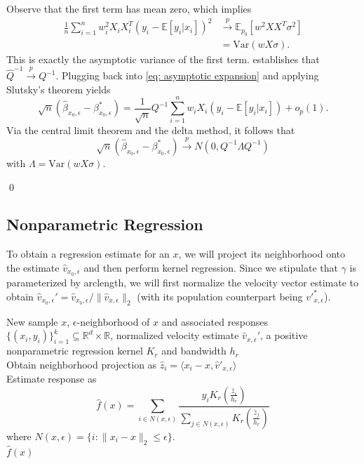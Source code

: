 \documentclass[11pt]{article}
\begin{document}
Observe that the first term has mean zero, which implies
\begin{align*}
    \frac{1}{n}\sum_{i = 1}^nw_i^2X_iX_i^T(y_i - \mathbb{E}[y_i|x_i])^2 &\overset{p}{\rightarrow} \mathbb{E}_{p_0}\left[w^2XX^T\sigma^2\right] \\
    &= \text{Var}\left(wX\sigma\right).
\end{align*}
This is exactly the asymptotic variance of the first term.   establishes that $\hat{Q}^{-1}\overset{p}{\rightarrow} Q^{-1}$. Plugging back into \cref{eq: asymptotic expansion} and applying Slutsky's theorem yields
\begin{equation}
    \sqrt{n}(\hat{\beta}_{x_0, \epsilon} - \beta_{x_0, \epsilon}^*) = \frac{1}{\sqrt{n}}Q^{-1}\sum_{i = 1}^nw_iX_i\left(y_i - \mathbb{E}[y_i|x_i]\right) + o_p(1).
\end{equation}
Via the central limit theorem and the delta method, it follows that
\begin{equation}
     \sqrt{n}(\hat{\beta}_{x_0, \epsilon} - \beta_{x_0, \epsilon}^*) \overset{p}{\rightarrow} N(0, Q^{-1}\Lambda Q^{-1})
\end{equation}
with $\Lambda = \text{Var}(wX\sigma)$. 

\qed{}

\subsection{Nonparametric Regression}

To obtain a regression estimate for an $x$, we will project its neighborhood onto the estimate $\hat{v}_{x_0, \epsilon}$ and then perform kernel regression. Since we stipulate that $\gamma$ is parameterized by arclength, we will first normalize the velocity vector estimate to obtain $\hat{v}_{x_0, \epsilon}' = \hat{v}_{x_0, \epsilon}/\|\hat{v}_{x, \epsilon}\|_2$ (with its population counterpart being $v'^{*}_{x, \epsilon}$). 

\begin{algorithm}[H]
    \begin{algorithmic}[1]
        \caption{Locally Linear Single Index Regression}
        \label{alg: LLR}
        \Require New sample $x$, $\epsilon$-neighborhood of $x$ and associated responses $\{(x_i, y_i)\}_{i=1}^k \subseteq \mathbb{R}^d \times \mathbb{R}$, normalized velocity estimate $\hat{v}_{x, \epsilon}'$, a positive nonparametric regression kernel $K_r$ and bandwidth $h_r$\\
        Obtain neighborhood projection as $\hat{z}_i = \langle x_i - x, \hat{v}'_{x, \epsilon} \rangle$ \\
        Estimate response as 
        \begin{equation} \label{eq: kernel regressor}
            \hat{f}(x) = \sum_{i \in N(x, \epsilon)}\frac{y_iK_r(\frac{\hat{z}_i}{h_r})}{\sum_{j\in N(x, \epsilon)}K_r(\frac{\hat{z}_j}{h_r})}
        \end{equation}
        where $N(x, \epsilon) = \{i : \|x_i - x\|_2 \leq \epsilon\}$. \\
        \Return $\hat{f}(x)$
    \end{algorithmic}
\end{algorithm}
\end{document}
